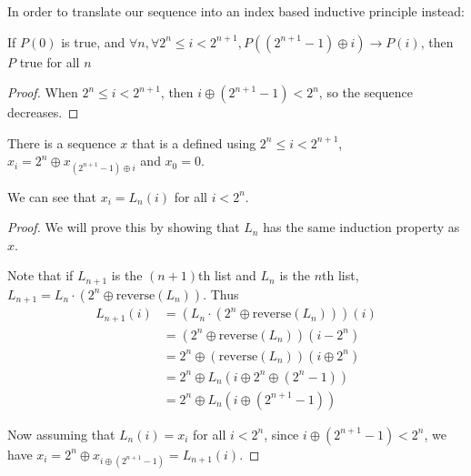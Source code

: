 \begin{theorem}
    \label{thm:recursion_principle}

    In order to translate our sequence into an index based inductive principle instead:
    
    If $P(0)$ is true, and $\forall n, \forall 2^n \le i < 2^{n+1}, P((2^{n+1} - 1) \oplus i) \to P(i)$, then
    $P$ true for all $n$
\end{theorem}

\begin{proof}
    When $2^n \le i < 2^{n+1}$, then $i \oplus (2^{n+1} - 1) < 2^n$, so
    the sequence decreases.
\end{proof}

\begin{definition}
    \label{def:recursive_gray_code}

    There is a sequence $x$ that is a defined using $2^n \le i < 2^{n+1}$, $x_i = 2^n \oplus x_{(2^{n+1} - 1) \oplus i}$
    and $x_0 = 0$.
\end{definition}

\begin{theorem}
    \label{thm:list_is_recursive}

    We can see that $x_i = L_n(i)$ for all $i < 2^n$. 
\end{theorem}

\begin{proof}
    We will prove this by showing that $L_n$ has the same induction property as $x$.

    Note that if $L_{n+1}$ is the $(n+1)$th list and $L_n$ is the $n$th list, $L_{n+1} = L_n \cdot (2^n \oplus \mathrm{reverse}(L_n))$. Thus
    \begin{align*}
    L_{n+1}(i) &= (L_n \cdot (2^n \oplus \mathrm{reverse}(L_n)))(i) \\
        &= (2^n \oplus \mathrm{reverse}(L_n))(i - 2^n) \\
        &= 2^n \oplus (\mathrm{reverse}(L_n))(i \oplus 2^n) \\
        &= 2^n \oplus L_n(i \oplus 2^n \oplus (2^n - 1)) \\
        &= 2^n \oplus L_n({i \oplus (2^{n+1} - 1)})
    \end{align*}

    Now assuming that $L_n(i) = x_i$ for all $i < 2^n$, since $i \oplus (2^{n+1} - 1) < 2^n$, we have
    $x_i = 2^n \oplus x_{i \oplus (2^{n+1} - 1)} = L_{n+1}(i)$.
\end{proof}


